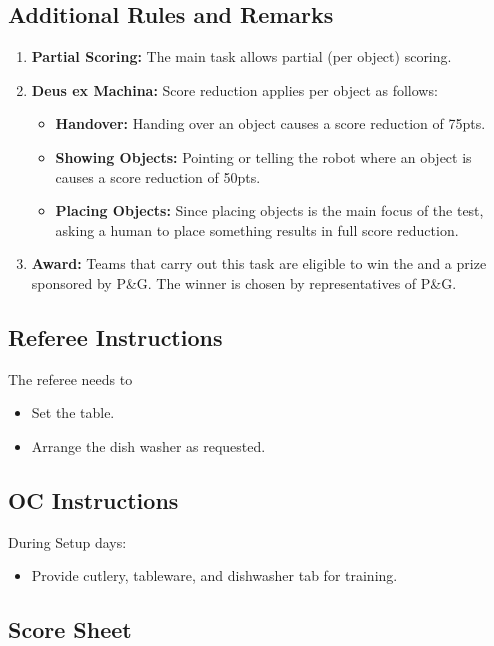 \subsection*{Additional Rules and Remarks}
\begin{enumerate}[nosep]
	\item \textbf{Partial Scoring:} The main task allows partial (per object) scoring.
	
	\item \textbf{Deus ex Machina:} Score reduction applies per object as follows:
	\begin{itemize}[nosep]
		\item \textbf{Handover:} Handing over an object causes a score reduction of 75pts.
		\item \textbf{Showing Objects:} Pointing or telling the robot where an object is causes a score reduction of 50pts.
		\item \textbf{Placing Objects:} Since placing objects is the main focus of the test, asking a human to place something results in full score reduction.
	\end{itemize}

	\item \textbf{Award:} Teams that carry out this task are eligible to win the \PGAward{} and a prize sponsored by P\&G. The winner is chosen by representatives of P\&G.

\end{enumerate}

\subsection*{Referee Instructions}

The referee needs to
\begin{itemize}
	\item Set the table.
	\item Arrange the dish washer as requested.
\end{itemize}

\subsection*{OC Instructions}
During Setup days:
\begin{itemize}
	\item Provide cutlery, tableware, and dishwasher tab for training.
\end{itemize}

\subsection*{Score Sheet}



